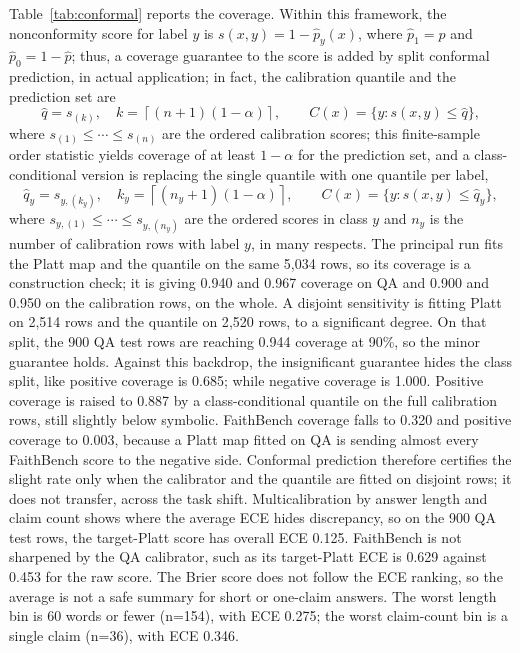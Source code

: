 \documentclass[a4paper,fleqn]{cas-sc}
\begin{document}
Table~\ref{tab:conformal} reports the coverage. Within this framework, the nonconformity score for label $y$ is $s(x,y)=1-\hat{p}_y(x)$, where $\hat{p}_1=\hat{p}$ and $\hat{p}_0=1-\hat{p}$; thus, a coverage guarantee to the score is added by split conformal prediction, in actual application; in fact, the calibration quantile and the prediction set are
\begin{equation}
  \hat{q} = s_{(k)}, \quad k = \left\lceil (n+1)(1-\alpha) \right\rceil,
  \qquad
  C(x) = \{y : s(x,y) \le \hat{q}\},
  \label{eq:conformal}
\end{equation}
where $s_{(1)} \le \cdots \le s_{(n)}$ are the ordered calibration scores; this finite-sample order statistic yields coverage of at least $1-\alpha$ for the prediction set, and a class-conditional version is replacing the single quantile with one quantile per label,
\begin{equation}
  \hat{q}_y = s_{y,(k_y)}, \quad k_y = \left\lceil (n_y+1)(1-\alpha) \right\rceil,
  \qquad
  C(x) = \{y : s(x,y) \le \hat{q}_y\},
  \label{eq:conformal_class}
\end{equation}
where $s_{y,(1)} \le \cdots \le s_{y,(n_y)}$ are the ordered scores in class $y$ and $n_y$ is the number of calibration rows with label $y$, in many respects.
The principal run fits the Platt map and the quantile on the same 5{,}034 rows, so its coverage is a construction check; it is giving 0.940 and 0.967 coverage on QA and 0.900 and 0.950 on the calibration rows, on the whole. A disjoint sensitivity is fitting Platt on 2{,}514 rows and the quantile on 2{,}520 rows, to a significant degree. On that split, the 900 QA test rows are reaching 0.944 coverage at 90\%, so the minor guarantee holds. Against this backdrop, the insignificant guarantee hides the class split, like positive coverage is 0.685; while negative coverage is 1.000. Positive coverage is raised to 0.887 by a class-conditional quantile on the full calibration rows, still slightly below symbolic. FaithBench coverage falls to 0.320 and positive coverage to 0.003, because a Platt map fitted on QA is sending almost every FaithBench score to the negative side. Conformal prediction therefore certifies the slight rate only when the calibrator and the quantile are fitted on disjoint rows; it does not transfer, across the task shift. Multicalibration by answer length and claim count shows where the average ECE hides discrepancy, so on the 900 QA test rows, the target-Platt score has overall ECE 0.125. FaithBench is not sharpened by the QA calibrator, such as its target-Platt ECE is 0.629 against 0.453 for the raw score. The Brier score does not follow the ECE ranking, so the average is not a safe summary for short or one-claim answers. The worst length bin is 60 words or fewer (n=154), with ECE 0.275; the worst claim-count bin is a single claim (n=36), with ECE 0.346.
\end{document}
